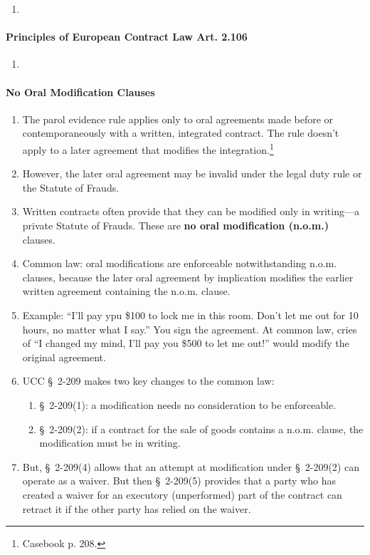 \begin{enumerate}
    \item %
\end{enumerate}

\paragraph{Principles of European Contract Law Art. 2.106}

\begin{enumerate}
    \item %
\end{enumerate}

\paragraph{No Oral Modification Clauses}

\begin{enumerate}
    \item The parol evidence rule applies only to oral agreements made before 
    or contemporaneously with a written, integrated contract. The rule doesn't 
    apply to a later agreement that modifies the 
    integration.\footnote{Casebook p. 208.}
    \item However, the later oral agreement may be invalid under the legal 
    duty rule or the Statute of Frauds.
    \item Written contracts often provide that they can be modified only in 
    writing---a private Statute of Frauds. These are \textbf{no oral 
    modification (n.o.m.)} clauses.
    \item Common law: oral modifications are enforceable notwithstanding 
    n.o.m. clauses, because the later oral agreement by implication modifies 
    the earlier written agreement containing the n.o.m. clause.
    \item Example: ``I'll pay ypu \$100 to lock me in this room. Don't let me 
    out for 10 hours, no matter what I say.'' You sign the agreement. At 
    common law, cries of ``I changed my mind, I'll pay you \$500 to let me 
    out!'' would modify the original agreement.
    \item UCC \S\ 2-209 makes two key changes to the common law:
    \begin{enumerate}
        \item \S\ 2-209(1): a modification needs no consideration to be 
        enforceable.
        \item \S\ 2-209(2): if a contract for the sale of goods contains a 
        n.o.m. clause, the modification must be in writing.
    \end{enumerate}
    \item But, \S\ 2-209(4) allows that an attempt at modification under \S\ 
    2-209(2) can operate as a waiver. But then \S\ 2-209(5) provides that a 
    party who has created a waiver for an executory (unperformed) part of the 
    contract can retract it if the other party has relied on the waiver.
\end{enumerate}


